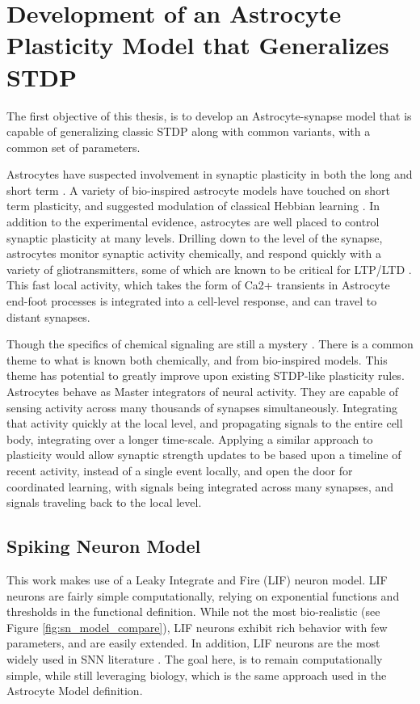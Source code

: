 %

\chapter{Development of an Astrocyte Plasticity Model that Generalizes STDP} \label{chapter:obj1}
    The first objective of this thesis, is to develop an Astrocyte-synapse model
    that is capable of generalizing classic STDP along with common
    variants, with a common set of parameters.

    Astrocytes have suspected involvement in synaptic plasticity in both the
    long \cite{min_2012} and short term \cite{pitta_2012}. A variety of
    bio-inspired astrocyte models have touched on short term plasticity, and
    suggested modulation of classical Hebbian learning \cite{pitta_2016}. In
    addition to the experimental evidence, astrocytes are well placed to control
    synaptic plasticity at many levels. Drilling down to the level of the
    synapse, astrocytes monitor synaptic activity chemically, and respond
    quickly with a variety of gliotransmitters, some of which are known to be
    critical for LTP/LTD \cite{min_2012}. This fast local activity, which takes
    the form of Ca2+ transients in Astrocyte end-foot processes is integrated
    into a cell-level response, and can travel to distant synapses.

    Though the specifics of chemical signaling are still a mystery
    \cite{manninen_2018}. There is a common theme to what is known both
    chemically, and from bio-inspired models. This theme has potential to
    greatly improve upon existing STDP-like plasticity rules. Astrocytes behave
    as Master integrators of neural activity. They are capable of sensing
    activity across many thousands of synapses simultaneously. Integrating that
    activity quickly at the local level, and propagating signals to the entire
    cell body, integrating over a longer time-scale. Applying a similar approach
    to plasticity would allow synaptic strength updates to be based upon a
    timeline of recent activity, instead of a single event locally, and open the
    door for coordinated learning, with signals being integrated across many
    synapses, and signals traveling back to the local level.

    \section{Spiking Neuron Model}
    This work makes use of a Leaky Integrate and Fire (LIF) neuron model. LIF
    neurons are fairly simple computationally, relying on exponential functions
    and thresholds in the functional definition. While not the most
    bio-realistic (see Figure \ref{fig:sn_model_compare}), LIF neurons exhibit
    rich behavior with few parameters, and are easily extended. In addition, LIF
    neurons are the most widely used in SNN literature \cite{ponulak_2011}. The
    goal here, is to remain computationally simple, while still leveraging
    biology, which is the same approach used in the Astrocyte Model definition.

